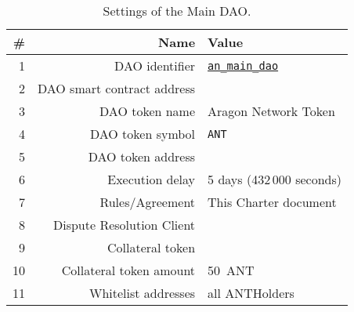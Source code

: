 
\label{chap:DAOParameters}


\begin{table}[h!]
	\caption{Settings of the Main DAO.}
	\centering
	\begin{tabular}{rrl}
		\toprule
		\# & Name & Value \\
		\midrule
		1 & \ac{DAO} identifier & \href{https://govern.aragon.org/\#/daos/an_main_dao}{\texttt{an\_main\_dao}}\\
		2 & \ac{DAO} smart contract address & \mainDaoAddr\\
		3 & \ac{DAO} token name & Aragon Network Token\\
		4 & \ac{DAO} token symbol & \texttt{\ac{ANT}}\\
		5 & \ac{DAO} token address & \mainDaoTokenAddr\\
		6 & Execution delay & 5 days (432\,000 seconds)\\
		7 & Rules/Agreement & This Charter document\\
		8 & Dispute Resolution Client & \aragonCourtAddr\\
		9 & Collateral token & \antTokenAddr\\
		10 & Collateral token amount & 50~\ac{ANT}\\
		11 & Whitelist addresses & all \glspl{ANTHolder}\\
		\bottomrule
	\end{tabular}
\end{table}



